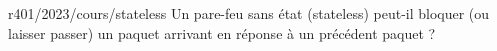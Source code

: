 \begin{question}{r401/2023/cours/stateless}
  Un pare-feu sans état (stateless) peut-il bloquer (ou laisser
  passer) un paquet arrivant en réponse à un précédent paquet ?
  \begin{reponseshoriz}
  \end{reponseshoriz}
\end{question}
